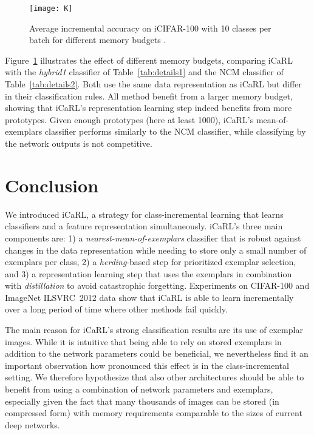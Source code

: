 \documentclass[10pt,twocolumn,letterpaper]{article}
\begin{document}
\begin{figure}[t]\centering
\texttt{[image: K]}
\caption{Average incremental accuracy on iCIFAR-100 with 10 classes per batch 
for different memory budgets .}\label{fig:K}
\end{figure}

Figure~\ref{fig:K} illustrates the effect of different memory budgets, 
comparing iCaRL with the \emph{hybrid1} classifier of Table~\ref{tab:details1} 
and the NCM classifier of Table~\ref{tab:details2}. 
Both use the same data representation as iCaRL 
but differ in their classification rules. 
All method benefit from a larger memory budget, showing that 
iCaRL's representation learning step indeed benefits from more 
prototypes.
Given enough prototypes (here at least 1000), iCaRL's 
mean-of-exemplars classifier performs similarly to the NCM classifier,
while classifying by the network outputs is not competitive.



\section{Conclusion}\label{sec:conclusion}
We introduced iCaRL, a strategy for class-incremental learning 
that learns classifiers and a feature representation simultaneously.
iCaRL's three main components are: 1) a \emph{nearest-mean-of-exemplars}
classifier that is robust against changes in the data representation
while needing to store only a small number of exemplars per class, 
2) a \emph{herding}-based step for prioritized exemplar selection, 
and 3) a representation learning step that uses the exemplars in
combination with \emph{distillation} to avoid catastrophic forgetting.
Experiments on CIFAR-100 and ImageNet ILSVRC~2012 data show that iCaRL 
is able to learn incrementally over a long period of time where other 
methods fail quickly.

The main reason for iCaRL's strong classification results are its 
use of exemplar images.
While it is intuitive that being able to rely on stored exemplars 
in addition to the network parameters could be beneficial, we 
nevertheless find it an important observation how pronounced this 
effect is in the class-incremental setting.
We therefore hypothesize that also other architectures should be
able to benefit from using a combination of network parameters 
and exemplars, especially given the fact that many thousands of 
images can be stored (in compressed form) with memory requirements 
comparable to the sizes of current deep networks. 
\end{document}
